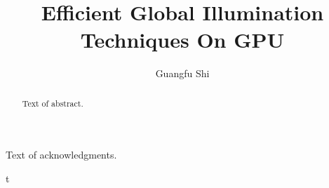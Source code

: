 \documentclass[12pt]{report}
\author{Guangfu Shi}
\title{Efficient Global Illumination Techniques On GPU}
\begin{document}
\begin{abstract}
  Text of abstract.  
\end{abstract}

\begin{acknowledgments}
  Text of acknowledgments.
\end{acknowledgments}


\setcounter{page}{1}t
	








	

		

%				

%                        

\end{document}
